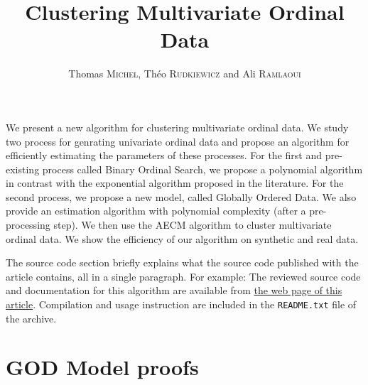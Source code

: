 \documentclass{ipol}
\title{Clustering Multivariate Ordinal Data}
\author{Thomas \textsc{Michel}, Théo \textsc{Rudkiewicz} and Ali \textsc{Ramlaoui}}
\begin{document}
\tableofcontents

\begin{ipolAbstract}
    We present a new algorithm for clustering multivariate ordinal data. We study two process for genrating univariate ordinal data and propose an algorithm for efficiently estimating the parameters of these processes. For the first and pre-existing process called Binary Ordinal Search, we propose a polynomial algorithm in contrast with the exponential algorithm proposed in the literature. For the second process, we propose a new model, called Globally Ordered Data. We also provide an estimation algorithm with polynomial complexity (after a pre-processing step). We then use the AECM algorithm to cluster multivariate ordinal data. We show the efficiency of our algorithm on synthetic and real data. 
\end{ipolAbstract}

\begin{ipolCode}
    The source code section briefly explains what the source code
    published with the article contains, all in a single paragraph. For
    example: The reviewed source code and documentation for this algorithm
    are available from \href{\ipolLink}{the web page of this
        article}. Compilation and usage instruction are included in the
    \verb|README.txt| file of the archive.
\end{ipolCode}






















\appendix







\section{GOD Model proofs}
\label{appendix:god}


\end{document}
